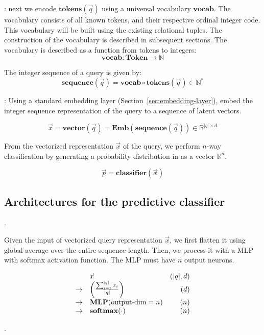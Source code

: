\documentclass[conference]{IEEEtran}
\begin{document}
: next we encode $\mathbf{tokens}(\vec q)$ using a universal
vocabulary $\mathbf{vocab}$.  The vocabulary consists of all known tokens, and their respective
ordinal integer code.  This vocabulary will be built using the existing relational tuples.  The construction of the vocabulary is described in subsequent sections.  The vocabulary is described as a function from tokens to integers:
$$ \mathbf{vocab} : \mathbf{Token} \to \mathbb{N}$$

The integer sequence of a query is given by:
$$
\mathbf{sequence}(\vec q) = \mathbf{vocab}\circ\mathbf{tokens} (\vec q) \in\mathbb{N}^*
$$

:
Using a standard embedding layer (Section~\ref{sec:embedding-layer}), embed the integer sequence representation of the query
to a sequence of latent vectors.

$$
\Vec{x} = \mathbf{vector}(\vec q) = \mathbf{Emb}(\mathbf{sequence}(\vec q))\in\mathbb{R}^{|q|\times d}
$$

From the vectorized representation $\Vec{x}$ of the query,
we perform $n$-way classification by generating a probability
distribution in as a vector $\mathbb{R}^n$.

$$\Vec{p} = \mathbf{classifier}(\Vec x)$$

\subsection{Architectures for the predictive classifier}
\label{sec:architectures}

.

Given the input of vectorized query representation $\vec x$, 
we first flatten it using global average over the entire sequence length.  Then, we process it with a MLP with softmax
activation function.  The MLP must have $n$ output neurons.

$$
\begin{array}{rlr}
&\vec x  & (|q|, d) \\
\to & \left(\frac{\sum_{i=1}^{|q|} x_i}{|q|}\right) & (d) \\
\to & \mathbf{MLP}(\makebox{output-dim}=n) & (n) \\
\to & \mathbf{softmax}(\cdot) & (n) \\
\end{array}
$$

.
\end{document}
